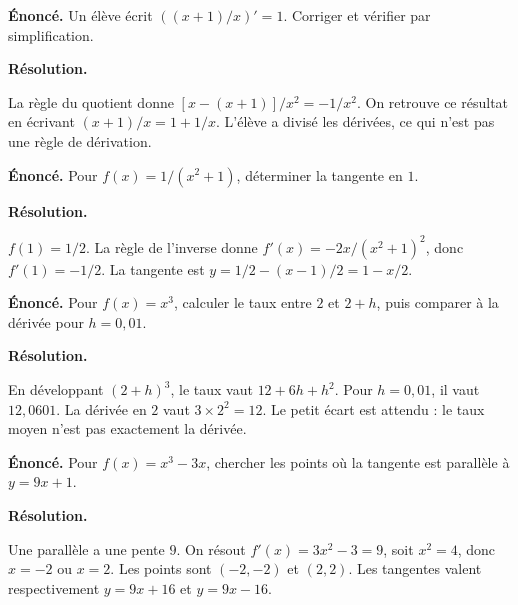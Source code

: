 \documentclass[11pt,a4paper]{article}
\begin{document}
\par\noindent\begin{minipage}{\linewidth}
{\small\color{Muted}\textbf{Énoncé.} Un élève écrit $((x+1)/x)\prime=1$. Corriger et vérifier par simplification.}
\par\medskip
\textbf{Résolution.}\par
La règle du quotient donne $[x-(x+1)]/x^2=-1/x^2$. On retrouve ce résultat en écrivant $(x+1)/x=1+1/x$. L’élève a divisé les dérivées, ce qui n’est pas une règle de dérivation.
\end{minipage}\par
\par\noindent\begin{minipage}{\linewidth}
{\small\color{Muted}\textbf{Énoncé.} Pour $f(x)=1/(x^2+1)$, déterminer la tangente en $1$.}
\par\medskip
\textbf{Résolution.}\par
$f(1)=1/2$. La règle de l’inverse donne $f\prime(x)=-2x/(x^2+1)^2$, donc $f\prime(1)=-1/2$. La tangente est $y=1/2-(x-1)/2=1-x/2$.
\end{minipage}\par
\par\noindent\begin{minipage}{\linewidth}
{\small\color{Muted}\textbf{Énoncé.} Pour $f(x)=x^3$, calculer le taux entre $2$ et $2+h$, puis comparer à la dérivée pour $h=0,01$.}
\par\medskip
\textbf{Résolution.}\par
En développant $(2+h)^3$, le taux vaut $12+6h+h^2$. Pour $h=0,01$, il vaut $12,0601$. La dérivée en $2$ vaut $3\times2^2=12$. Le petit écart est attendu : le taux moyen n’est pas exactement la dérivée.
\end{minipage}\par
\par\noindent\begin{minipage}{\linewidth}
{\small\color{Muted}\textbf{Énoncé.} Pour $f(x)=x^3-3x$, chercher les points où la tangente est parallèle à $y=9x+1$.}
\par\medskip
\textbf{Résolution.}\par
Une parallèle a une pente $9$. On résout $f\prime(x)=3x^2-3=9$, soit $x^2=4$, donc $x=-2$ ou $x=2$. Les points sont $(-2,-2)$ et $(2,2)$. Les tangentes valent respectivement $y=9x+16$ et $y=9x-16$.
\end{minipage}\par
\end{document}
